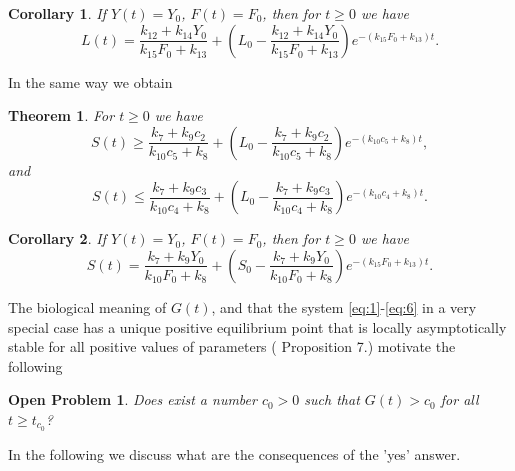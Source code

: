 \documentclass[pdflatex,sn-mathphys-num]{sn-jnl}
\theoremstyle{thmstyleone}
\newtheorem{theorem}{Theorem}[section]
\newtheorem{corollary}{Corollary}[section]
\theoremstyle{thmstyletwo}
\theoremstyle{thmstylethree}
\newtheorem{openproblem}{Open Problem}[section]
\begin{document}
\begin{corollary}
If $Y(t)=Y_0$, $F(t)=F_0$, then for $t\geq 0$ we have
\begin{equation*}
L(t)=\frac{k_{12}+k_{14}Y_0}{k_{15}F_0+k_{13}}+\left( L_0-\frac{k_{12}+k_{14}Y_0}{k_{15}F_0+k_{13}} 
\right) e^{-(k_{15}F_0+k_{13})t}.
\end{equation*}
\end{corollary}

In the same way we obtain
\begin{theorem}
For $t\geq 0$ we have
\begin{equation*}
S(t) \geq \frac{k_{7}+k_{9}c_2}{k_{10}c_5+k_{8}}+
\left( L_0-\frac{k_{7}+k_{9}c_2}{k_{10}c_5+k_{8}} \right)e^{-(k_{10}c_5+k_{8})t},
\end{equation*}
and
\begin{equation*}
S(t) \leq \frac{k_{7}+k_{9}c_3}{k_{10}c_4+k_{8}}+
\left( L_0-\frac{k_{7}+k_{9}c_3}{k_{10}c_4+k_{8}} \right)e^{-(k_{10}c_4+k_{8})t}.
\end{equation*}
\end{theorem}

\begin{corollary}
If $Y(t)=Y_0$, $F(t)=F_0$, then for $t\geq 0$ we have
\begin{equation*}
S(t)=\frac{k_{7}+k_{9}Y_0}{k_{10}F_0+k_{8}}+\left( S_0-\frac{k_{7}+k_{9}Y_0}{k_{10}F_0+k_{8}} 
\right) e^{-(k_{15}F_0+k_{13})t}.
\end{equation*}
\end{corollary}

The biological meaning of $G(t)$, and that the system \eqref{eq:1}-\eqref{eq:6} in a very special case has 
a unique positive equilibrium point that is locally asymptotically stable for all positive values 
of parameters (\cite{degaetano2024} Proposition 7.) motivate the following 

\begin{openproblem}\label{open:G bounded below}
Does exist a number $c_0>0$ such that $G(t)> c_0$ for all $t\geq t_{c_0}$?
\end{openproblem}

In the following we discuss what are the consequences of the 'yes' answer. 
\end{document}
